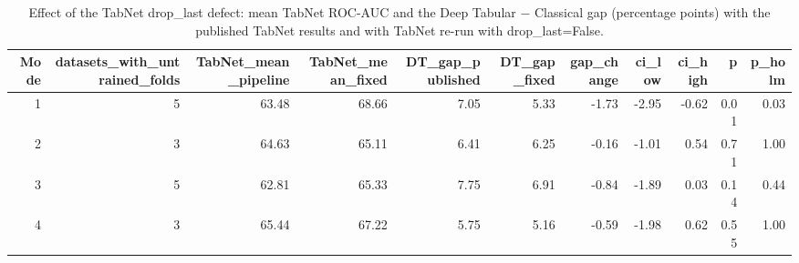 \begin{table}
\caption{Effect of the TabNet drop\_last defect: mean TabNet ROC-AUC and the Deep Tabular $-$ Classical gap (percentage points) with the published TabNet results and with TabNet re-run with drop\_last=False.}
\label{tab:r32_tabnet_summary}
\begin{tabular}{rrrrrrrrrrr}
\toprule
Mode & datasets\_with\_untrained\_folds & TabNet\_mean\_pipeline & TabNet\_mean\_fixed & DT\_gap\_published & DT\_gap\_fixed & gap\_change & ci\_low & ci\_high & p & p\_holm \\
\midrule
1 & 5 & 63.48 & 68.66 & 7.05 & 5.33 & -1.73 & -2.95 & -0.62 & 0.01 & 0.03 \\
2 & 3 & 64.63 & 65.11 & 6.41 & 6.25 & -0.16 & -1.01 & 0.54 & 0.71 & 1.00 \\
3 & 5 & 62.81 & 65.33 & 7.75 & 6.91 & -0.84 & -1.89 & 0.03 & 0.14 & 0.44 \\
4 & 3 & 65.44 & 67.22 & 5.75 & 5.16 & -0.59 & -1.98 & 0.62 & 0.55 & 1.00 \\
\bottomrule
\end{tabular}
\end{table}

